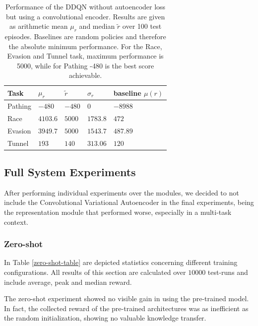 \begin{table}[t!]
\centering
\begin{tabular}{@{}lllll@{}}
\toprule
\textbf{Task} & \textbf{$\mu_r$} & \textbf{$\widetilde{r}$} & \textbf{$\sigma_r$} & \textbf{baseline} \textbf{$\mu(r)$} \\ \midrule
Pathing & $-480$ & $-480$ & $0$ & $-8988$ \\
Race & $4103.6$ & $5000$ & $1783.8$ & $472$ \\
Evasion & $3949.7$ & $5000$ & $1543.7$ & $487.89$ \\
Tunnel & $193$ & $140$ & $313.06$ & $120$\\ 
\bottomrule
\end{tabular}
\caption{Performance of the DDQN without autoencoder loss but using a convolutional encoder. Results are given as arithmetic mean $\mu_r$ and median $\widetilde{r}$ over 100 test episodes. Baselines are random policies and therefore the absolute minimum performance. For the Race, Evasion and Tunnel task, maximum performance is 5000, while for Pathing -480 is the best score achievable.}
\label{tab:isolated_policy_learner}
\end{table}

\subsection{Full System Experiments}
After performing individual experiments over the modules, we decided to not include the Convolutional Variational Autoencoder in the final experiments, being the representation module that performed worse, especially in a multi-task context.

\subsubsection{Zero-shot}
In Table \ref{zero-shot-table} are depicted statistics concerning different training configurations.
All results of this section are calculated over $10000$ test-runs and include average, peak and median reward.

The zero-shot experiment showed no visible gain in using the pre-trained model. In fact, the collected reward of the pre-trained architectures was as inefficient as the random initialization, showing no valuable knowledge transfer.

